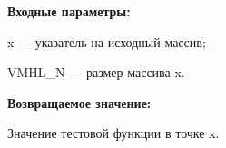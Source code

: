 \textbf{Входные параметры:}

x --- указатель на исходный массив;
 
VMHL\_N --- размер массива x.

\textbf{Возвращаемое значение:} 
 
Значение тестовой функции в точке x.